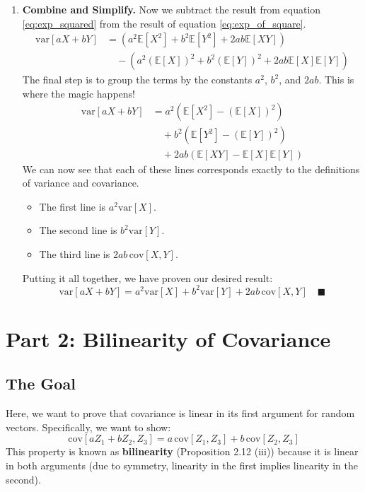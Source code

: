 \documentclass[11pt,a4paper]{article}
\begin{document}
\begin{enumerate}
    \item \textbf{Combine and Simplify.}
    Now we subtract the result from equation \eqref{eq:exp_squared} from the result of equation \eqref{eq:exp_of_square}.
    \begin{align*}
        \text{var}[aX+bY] &= \left( a^2\mathbb{E}[X^2] + b^2\mathbb{E}[Y^2] + 2ab\mathbb{E}[XY] \right) \\
                         &\quad - \left( a^2(\mathbb{E}[X])^2 + b^2(\mathbb{E}[Y])^2 + 2ab\mathbb{E}[X]\mathbb{E}[Y] \right)
    \end{align*}
    The final step is to group the terms by the constants $a^2$, $b^2$, and $2ab$. This is where the magic happens!
    \begin{align*}
        \text{var}[aX+bY] &= a^2(\mathbb{E}[X^2] - (\mathbb{E}[X])^2) \\
                         &\quad + b^2(\mathbb{E}[Y^2] - (\mathbb{E}[Y])^2) \\
                         &\quad + 2ab(\mathbb{E}[XY] - \mathbb{E}[X]\mathbb{E}[Y])
    \end{align*}
    We can now see that each of these lines corresponds exactly to the definitions of variance and covariance.
    \begin{itemize}
        \item The first line is $a^2 \text{var}[X]$.
        \item The second line is $b^2 \text{var}[Y]$.
        \item The third line is $2ab\,\text{cov}[X,Y]$.
    \end{itemize}
    Putting it all together, we have proven our desired result:
    \[
        \text{var}[aX + bY] = a^2 \text{var}[X] + b^2 \text{var}[Y] + 2ab\,\text{cov}[X,Y] \quad \blacksquare
    \]
\end{enumerate}


\section{Part 2: Bilinearity of Covariance}

\subsection{The Goal}
Here, we want to prove that covariance is linear in its first argument for random vectors. Specifically, we want to show:
\[
    \text{cov}[aZ_1 + bZ_2, Z_3] = a\,\text{cov}[Z_1, Z_3] + b\,\text{cov}[Z_2, Z_3]
\]
This property is known as \textbf{bilinearity} (Proposition 2.12 (iii)) because it is linear in both arguments (due to symmetry, linearity in the first implies linearity in the second).
\end{document}
